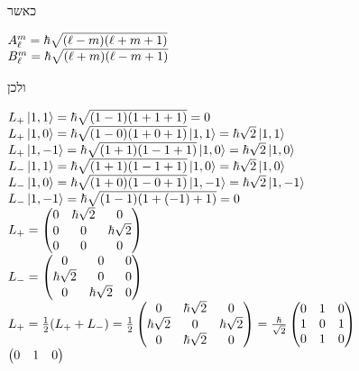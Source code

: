 \documentclass[14pt]{extarticle}
\makeatletter
\newenvironment{lefteqs}{%
    \begin{english}%
    \begin{flushleft}%
    \renewcommand{\arraystretch}{1.3}%
    $\begin{array}{@{}l@{}}%
}{%
    \end{array}$%
    \end{flushleft}%
    \end{english}%
}
\makeatother
\begin{document}
כאשר

\begin{lefteqs}
    A_{\ell}^m = \hbar \sqrt{(\ell - m)(\ell + m + 1)} \\
    B_{\ell}^m = \hbar \sqrt{(\ell + m)(\ell - m + 1)} \\
\end{lefteqs}

ולכן

\begin{lefteqs}
    L_+ \ket{1,1} = \hbar \sqrt{(1-1)(1+1+1)} = 0 \\
    L_+ \ket{1,0} = \hbar \sqrt{(1-0)(1+0+1)} \ket{1,1} = \hbar \sqrt{2} \ket{1,1} \\
    L_+ \ket{1, -1} = \hbar \sqrt{(1+1)(1-1+1)} \ket{1,0} = \hbar \sqrt{2} \ket{1,0} \\
    L_- \ket{1,1} = \hbar \sqrt{(1+1)(1-1+1)} \ket{1,0} = \hbar \sqrt{2} \ket{1,0} \\
    L_- \ket{1,0} = \hbar \sqrt{(1+0)(1-0+1)} \ket{1,-1} = \hbar \sqrt{2} \ket{1,-1} \\
    L_- \ket{1,-1} = \hbar \sqrt{(1-1)(1+(-1)+1)} = 0 \\
    L_+ = \begin{pmatrix}
        0 & \hbar \sqrt{2} & 0 \\
        0 & 0 & \hbar \sqrt{2} \\
        0 & 0 & 0
    \end{pmatrix} \\
    L_- = \begin{pmatrix}
        0 & 0 & 0 \\
        \hbar \sqrt{2} & 0 & 0 \\
        0 & \hbar \sqrt{2} & 0
    \end{pmatrix} \\
    L_+ = \frac{1}{2} (L_+ + L_-) = \frac{1}{2} \begin{pmatrix}
        0 & \hbar \sqrt{2} & 0 \\
        \hbar \sqrt{2} & 0 & \hbar \sqrt{2} \\
        0 & \hbar \sqrt{2} & 0
    \end{pmatrix} = \frac{\hbar}{\sqrt{2}} \begin{pmatrix}
        0 & 1 & 0 \\
        1 & 0 & 1 \\
        0 & 1 & 0
    \end{pmatrix} \\
    \begin{pmatrix}
        0 & 1 & 0 \\

\end{pmatrix}
\end{lefteqs}
\end{document}
